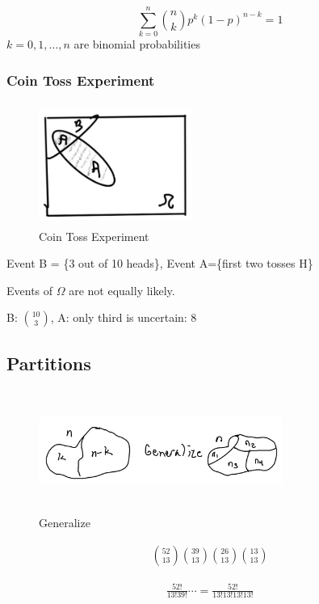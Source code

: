 \documentclass{article}
\begin{document}
$$
\sum_{k=0}^{n} {n \choose k} p^k(1-p)^{n-k}=1
$$
$k=0,1,\ldots,n$ are binomial probabilities

\subsubsection{Coin Toss Experiment}

\begin{figure}[h]
\centering
\includegraphics[width=5cm, height=4cm]{images/L04/coin_toss_exp.jpeg}
\caption{Coin Toss Experiment}
\end{figure}

Event B = \{3 out of 10 heads\}, Event A=\{first two tosses H\}

Events of $\Omega$ are not equally likely.

B: ${10 \choose 3}$, A: only third is uncertain: 8

\subsection{Partitions}


\begin{figure}[h]
\centering
\includegraphics[width=8cm, height=4cm]{images/L04/generalize.jpeg}
\caption{Generalize}
\end{figure}

\begin{align*}
    {52 \choose 13}{39 \choose 13}{26 \choose 13}{13 \choose 13}
\end{align*}

\begin{align*}
    \frac{52!}{13!39!} \cdots = \frac{52!}{13!13!13!13!}
\end{align*}
\end{document}
